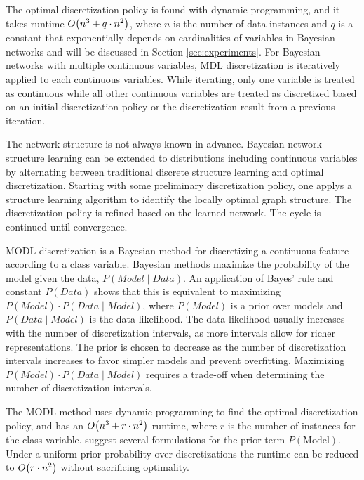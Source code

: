 The optimal discretization policy is found with dynamic programming, and it takes runtime $\bigo\paren{n^3 + q \cdot n^2}$, where $n$ is the number of data instances and $q$ is a constant that exponentially depends on cardinalities of variables in Bayesian networks and will be discussed in Section \ref{sec:experiments}.
For Bayesian networks with multiple continuous variables, MDL discretization is iteratively applied to each continuous variables.
While iterating, only one variable is treated as continuous while all other continuous variables are treated as discretized based on an initial discretization policy or the discretization result from a previous iteration.

The network structure is not always known in advance.
Bayesian network structure learning can be extended to distributions including continuous variables by alternating between traditional discrete structure learning and optimal discretization.
Starting with some preliminary discretization policy, one applys a structure learning algorithm to identify the locally optimal graph structure.
The discretization policy is refined based on the learned network.
The cycle is continued until convergence.

MODL discretization \citep{Boulle_2006} is a Bayesian method for discretizing a continuous feature according to a class variable.
Bayesian methods maximize the probability of the model given the data, $P(\textit{Model} \mid \textit{Data})$.
An application of Bayes' rule and constant $P(\textit{Data})$ shows that this is equivalent to maximizing ${P(\textit{Model}) \cdot P(\textit{Data} \mid \textit{Model})}$, where $P(\textit{Model})$ is a prior over models and ${P(\textit{Data} \mid \textit{Model})}$ is the data likelihood.
The data likelihood usually increases with the number of discretization intervals, as more intervals allow for richer representations.
The prior is chosen to decrease as the number of discretization intervals increases to favor simpler models and prevent overfitting.
Maximizing ${P(\textit{Model}) \cdot P(\textit{Data} \mid \textit{Model})}$ requires a trade-off when determining the number of discretization intervals.

The MODL method uses dynamic programming to find the optimal discretization policy, and has an $\bigo\paren{n^3 + r \cdot n^2}$ runtime, where $r$ is the number of instances for the class variable.
\cite{Lustgarten_2011} suggest several formulations for the prior term $P(\text{Model})$.
Under a uniform prior probability over discretizations the runtime can be reduced to $\bigo\paren{r \cdot n^2}$ without sacrificing optimality.


